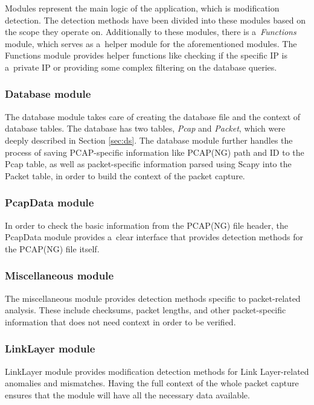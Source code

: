 \documentclass[
  printed,     %
  color,       %
  oneside,     %
  nosansbold,  %
  nocolorbold, %
  nolof,         %
  nolot,         %
]{fithesis4}
\begin{document}
Modules represent the main logic of the application, which is modification detection. The detection methods have been divided into these modules based on the scope they operate on. Additionally to these modules, there is a~\textit{Functions} module, which serves as a~helper module for the aforementioned modules. The Functions module provides helper functions like checking if the specific IP is a~private IP or providing some complex filtering on the database queries.

\subsubsection{Database module}

The database module takes care of creating the database file and the context of database tables. The database has two tables, \textit{Pcap} and \textit{Packet}, which were deeply described in Section \ref{sec:ds}. The database module further handles the process of saving PCAP-specific information like PCAP(NG) path and ID to the Pcap table, as well as packet-specific information parsed using Scapy into the Packet table, in order to build the context of the packet capture.

\subsubsection{PcapData module}

In order to check the basic information from the PCAP(NG) file header, the PcapData module provides a~clear interface that provides detection methods for the PCAP(NG) file itself.

\subsubsection{Miscellaneous module}

The miscellaneous module provides detection methods specific to packet-related analysis. These include checksums, packet lengths, and other packet-specific information that does not need context in order to be verified.

\subsubsection{LinkLayer module}

LinkLayer module provides modification detection methods for Link Layer-related anomalies and mismatches. Having the full context of the whole packet capture ensures that the module will have all the necessary data available.
\end{document}
